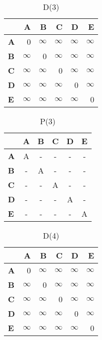 \documentclass{article}
\newcommand{\INF}{$\infty$}
\begin{document}
\begin{table}[H]\centering
\caption{D(3)}
\begin{tabular}{l r r r r r}
\toprule
 & \textbf{A} & \textbf{B} & \textbf{C} & \textbf{D} & \textbf{E}\\\midrule
\textbf{A} & 0 & \INF & \INF & \INF & \INF \\
\textbf{B} & \INF & 0 & \INF & \INF & \INF \\
\textbf{C} & \INF & \INF & 0 & \INF & \INF \\
\textbf{D} & \INF & \INF & \INF & 0 & \INF \\
\textbf{E} & \INF & \INF & \INF & \INF & 0 \\
\bottomrule
\end{tabular}
\end{table}

\begin{table}[H]\centering
\caption{P(3)}
\begin{tabular}{l c c c c c}
\toprule
 & \textbf{A} & \textbf{B} & \textbf{C} & \textbf{D} & \textbf{E}\\\midrule
\textbf{A} & A & - & - & - & - \\
\textbf{B} & - & A & - & - & - \\
\textbf{C} & - & - & A & - & - \\
\textbf{D} & - & - & - & A & - \\
\textbf{E} & - & - & - & - & A \\
\bottomrule
\end{tabular}
\end{table}

\begin{table}[H]\centering
\caption{D(4)}
\begin{tabular}{l r r r r r}
\toprule
 & \textbf{A} & \textbf{B} & \textbf{C} & \textbf{D} & \textbf{E}\\\midrule
\textbf{A} & 0 & \INF & \INF & \INF & \INF \\
\textbf{B} & \INF & 0 & \INF & \INF & \INF \\
\textbf{C} & \INF & \INF & 0 & \INF & \INF \\
\textbf{D} & \INF & \INF & \INF & 0 & \INF \\
\textbf{E} & \INF & \INF & \INF & \INF & 0 \\
\bottomrule
\end{tabular}
\end{table}
\end{document}
